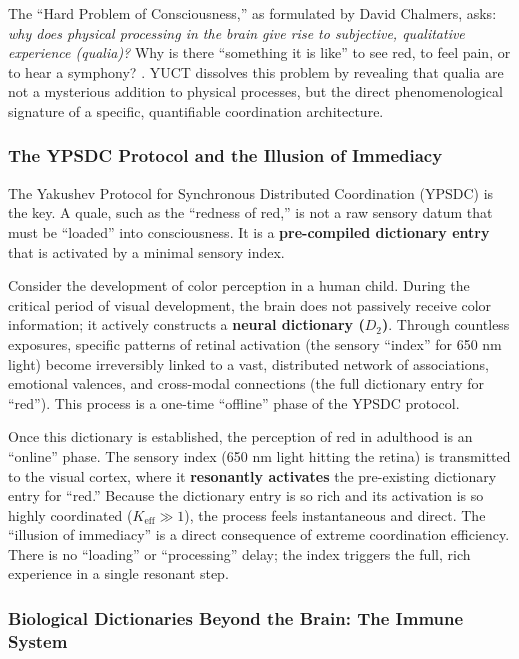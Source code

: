 \documentclass[12pt,a4paper]{article}
\begin{document}
	The ``Hard Problem of Consciousness,'' as formulated by David Chalmers, asks: \textit{why does physical processing in the brain give rise to subjective, qualitative experience (qualia)?} Why is there ``something it is like'' to see red, to feel pain, or to hear a symphony? \cite{Chalmers1995}. YUCT dissolves this problem by revealing that qualia are not a mysterious addition to physical processes, but the direct phenomenological signature of a specific, quantifiable coordination architecture.
	
	\subsubsection{The YPSDC Protocol and the Illusion of Immediacy}
	
	The Yakushev Protocol for Synchronous Distributed Coordination (YPSDC) is the key. A quale, such as the ``redness of red,'' is not a raw sensory datum that must be ``loaded'' into consciousness. It is a \textbf{pre-compiled dictionary entry} that is activated by a minimal sensory index.
	
	Consider the development of color perception in a human child. During the critical period of visual development, the brain does not passively receive color information; it actively constructs a \textbf{neural dictionary (\(D_2\))}. Through countless exposures, specific patterns of retinal activation (the sensory ``index'' for 650 nm light) become irreversibly linked to a vast, distributed network of associations, emotional valences, and cross-modal connections (the full dictionary entry for ``red''). This process is a one-time ``offline'' phase of the YPSDC protocol.
	
	Once this dictionary is established, the perception of red in adulthood is an ``online'' phase. The sensory index (650 nm light hitting the retina) is transmitted to the visual cortex, where it \textbf{resonantly activates} the pre-existing dictionary entry for ``red.'' Because the dictionary entry is so rich and its activation is so highly coordinated (\(K_{\mathrm{eff}} \gg 1\)), the process feels instantaneous and direct. The ``illusion of immediacy'' is a direct consequence of extreme coordination efficiency. There is no ``loading'' or ``processing'' delay; the index triggers the full, rich experience in a single resonant step.
	
	\subsubsection{Biological Dictionaries Beyond the Brain: The Immune System}
	
\end{document}
